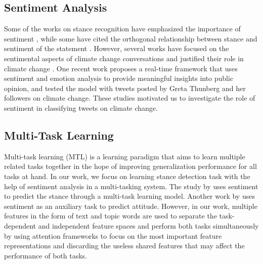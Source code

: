 \documentclass[letterpaper]{article} %
\begin{document}
\subsection{Sentiment Analysis}\label{rw_sent}
Some of the works on stance recognition have emphasized the importance of sentiment \cite{wang2020neural}, while some have cited the orthogonal relationship between stance and sentiment of the statement \cite{sen2020reliability}. However, several works have focused on the sentimental aspects of climate change conversations and justified their role in climate change \cite{cody2015climate,jiang2017comparing}. One recent work \cite{el2021novel} proposes a real-time framework that uses sentiment and emotion analysis to provide meaningful insights into public opinion, and tested the model with tweets posted by Greta Thunberg and her followers on climate change. These studies motivated us to investigate the role of sentiment in classifying tweets on climate change.

\subsection{Multi-Task Learning}
\par \noindent Multi-task learning (MTL) \cite{caruana1997multitask} is a learning paradigm that aims to learn multiple related tasks together in the hope of improving generalization performance for all tasks at hand. %
In our work, we focus on learning stance detection task with the help of sentiment analysis in a multi-tasking system. The study by \cite{ li2019multi} uses sentiment to predict the stance through a multi-task learning model. Another work by \cite{chauhan2019attention} uses sentiment as an auxiliary task to predict attitude. However, in our work, multiple features in the form of text and topic words are used to separate the task-dependent and independent feature spaces and perform both tasks simultaneously by using attention frameworks to focus on the most important feature representations and discarding the useless shared features that may affect the performance of both tasks.
\end{document}

